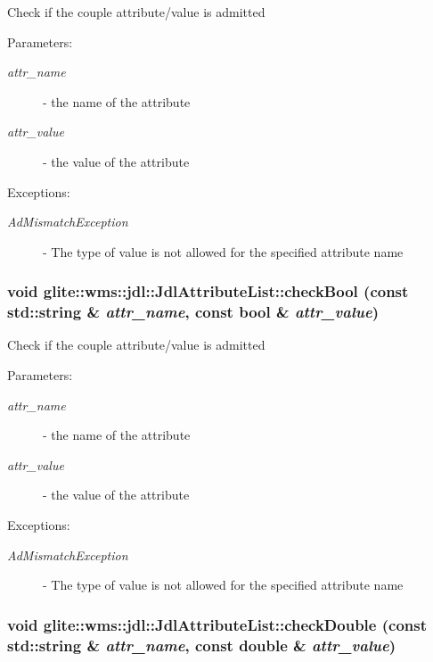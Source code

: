 Check if the couple attribute/value is admitted \begin{Desc}
\item[Parameters:]
\begin{description}
\item[{\em attr\_\-name}]- the name of the attribute \item[{\em attr\_\-value}]- the value of the attribute \end{description}
\end{Desc}
\begin{Desc}
\item[Exceptions:]
\begin{description}
\item[{\em Ad\-Mismatch\-Exception}]- The type of value is not allowed for the specified attribute name \end{description}
\end{Desc}
\hypertarget{classglite_1_1wms_1_1jdl_1_1JdlAttributeList_z25_3}{
\subsubsection[checkBool]{\setlength{\rightskip}{0pt plus 5cm}void glite::wms::jdl::Jdl\-Attribute\-List::check\-Bool (const std::string \& {\em attr\_\-name}, const bool \& {\em attr\_\-value})}}
\label{classglite_1_1wms_1_1jdl_1_1JdlAttributeList_z25_3}


Check if the couple attribute/value is admitted \begin{Desc}
\item[Parameters:]
\begin{description}
\item[{\em attr\_\-name}]- the name of the attribute \item[{\em attr\_\-value}]- the value of the attribute \end{description}
\end{Desc}
\begin{Desc}
\item[Exceptions:]
\begin{description}
\item[{\em Ad\-Mismatch\-Exception}]- The type of value is not allowed for the specified attribute name \end{description}
\end{Desc}
\hypertarget{classglite_1_1wms_1_1jdl_1_1JdlAttributeList_z25_2}{
\subsubsection[checkDouble]{\setlength{\rightskip}{0pt plus 5cm}void glite::wms::jdl::Jdl\-Attribute\-List::check\-Double (const std::string \& {\em attr\_\-name}, const double \& {\em attr\_\-value})}}
\label{classglite_1_1wms_1_1jdl_1_1JdlAttributeList_z25_2}


